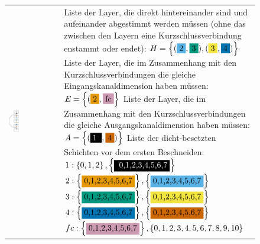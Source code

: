 \begin{figure}
\begin{minipage}[c]{1\linewidth}
\begin{tabularx}{1\linewidth}{m{0.22\linewidth}m{0.88\linewidth}} \includegraphics[width=0.21\textwidth]{KapitelPartA/images/net.png} &Liste der Layer, die direkt hintereinander sind und aufeinander abgestimmt werden müssen (ohne das zwischen den Layern eine Kurzschlussverbindung enstammt oder endet): $H=\left\{(\colorbox{sky}{2},\colorbox{bluegreen}{3}),(\colorbox{yellow}{3},\colorbox{blue2}{4}) \right\}$\newline
Liste der Layer, die im Zusammenhang mit den Kurzschlussverbindungen die gleiche Eingangskanaldimension haben müssen: \newline$E=\left\{(\colorbox{orange}{2},\colorbox{purple}{fc} \right\}$ \newline
Liste der Layer, die im Zusammenhang mit den Kurzschlussverbindungen die gleiche Ausgangskanaldimension haben müssen: $A=\left\{ ( \colorbox{black}{\textcolor{white}{1} },\colorbox{vermi}{4} ) \right\} $ \newline
Liste der dicht-besetzten Schichten vor dem ersten Beschneiden:\newline
$1:\left\{0,1,2\right\},\left\{\colorbox{black}{ \textcolor{white}{0,1,2,3,4,5,6,7}} \right\}$ \newline
$2:\left\{\colorbox{orange}{0,1,2,3,4,5,6,7}\right\},\left\{\colorbox{sky}{0,1,2,3,4,5,6,7}\right\}$\newline
$3:\left\{\colorbox{bluegreen}{0,1,2,3,4,5,6,7}\right\},\left\{\colorbox{yellow}{0,1,2,3,4,5,6,7}\right\}$\newline
$4:\left\{\colorbox{blue2}{0,1,2,3,4,5,6,7}\right\},\left\{\colorbox{vermi}{0,1,2,3,4,5,6,7}\right\}$ \newline
$fc:\left\{\colorbox{purple}{0,1,2,3,4,5,6,7}\right\},\left\{0,1,2,3,4,5,6,7,8,9,10\right\}$\\

\end{tabularx}
\end{minipage}
\end{figure}
